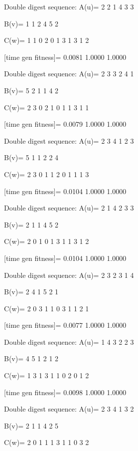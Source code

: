 Double digest sequence:
A(u)=
     2     2     1     4     3     3

B(v)=
     1     1     2     4     5     2

C(w)=
     1     1     0     2     0     1     3     1     3     1     2

[time gen fitness]=
    0.0081    1.0000    1.0000

Double digest sequence:
A(u)=
     2     3     3     2     4     1

B(v)=
     5     2     1     1     4     2

C(w)=
     2     3     0     2     1     0     1     1     3     1     1

[time gen fitness]=
    0.0079    1.0000    1.0000

Double digest sequence:
A(u)=
     2     3     4     1     2     3

B(v)=
     5     1     1     2     2     4

C(w)=
     2     3     0     1     1     2     0     1     1     1     3

[time gen fitness]=
    0.0104    1.0000    1.0000

Double digest sequence:
A(u)=
     2     1     4     2     3     3

B(v)=
     2     1     1     4     5     2

C(w)=
     2     0     1     0     1     3     1     1     3     1     2

[time gen fitness]=
    0.0104    1.0000    1.0000

Double digest sequence:
A(u)=
     2     3     2     3     1     4

B(v)=
     2     4     1     5     2     1

C(w)=
     2     0     3     1     1     0     3     1     1     2     1

[time gen fitness]=
    0.0077    1.0000    1.0000

Double digest sequence:
A(u)=
     1     4     3     2     2     3

B(v)=
     4     5     1     2     1     2

C(w)=
     1     3     1     3     1     1     0     2     0     1     2

[time gen fitness]=
    0.0098    1.0000    1.0000

Double digest sequence:
A(u)=
     2     3     4     1     3     2

B(v)=
     2     1     1     4     2     5

C(w)=
     2     0     1     1     1     3     1     1     0     3     2

